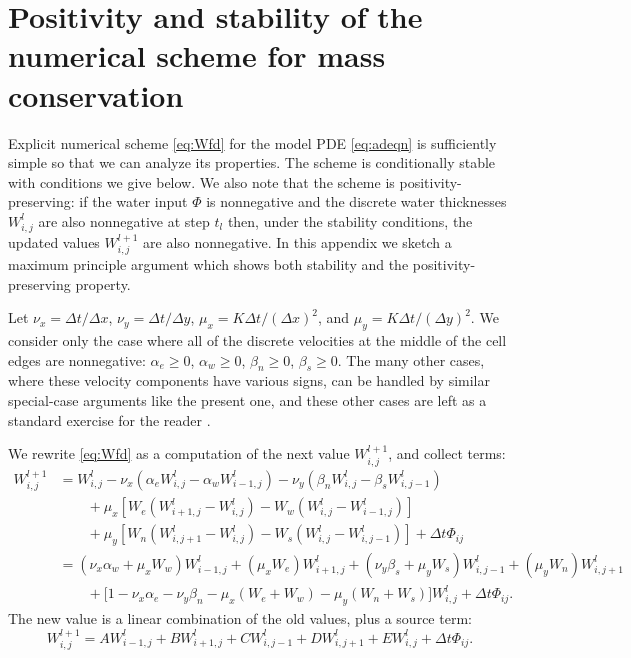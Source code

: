 \documentclass[11pt,final]{amsart}%
\newcommand{\Wlij}{W^l_{i,j}}
\begin{document}
\small

\normalsize

\appendix

\section{Positivity and stability of the numerical scheme for mass conservation}

Explicit numerical scheme \eqref{eq:Wfd} for the model PDE \eqref{eq:adeqn} is sufficiently simple so that we can analyze its properties.  The scheme is conditionally stable with conditions we give below.  We also note that the scheme is positivity-preserving: if the water input $\Phi$ is nonnegative and the discrete water thicknesses $\Wlij$ are also nonnegative at step $t_l$ then, under the stability conditions, the updated values $W_{i,j}^{l+1}$ are also nonnegative.  In this appendix we sketch a maximum principle argument \citep{MortonMayers} which shows both stability and the positivity-preserving property.

Let $\nu_x = \Delta t/\Delta x$, $\nu_y = \Delta t/\Delta y$, $\mu_x = K \Delta t / (\Delta x)^2$, and $\mu_y = K \Delta t / (\Delta y)^2$.  We consider only the case where all of the discrete velocities at the middle of the cell edges are nonnegative: $\alpha_e\ge 0$, $\alpha_w\ge 0$, $\beta_n\ge 0$, $\beta_s\ge 0$.  The many other cases, where these velocity components have various signs, can be handled by similar special-case arguments like the present one, and these other cases are left as a standard exercise for the reader \citep{MortonMayers}.

We rewrite \eqref{eq:Wfd} as a computation of the next value $W_{i,j}^{l+1}$, and collect terms:
\begin{align*}
 W_{i,j}^{l+1} &= \Wlij - \nu_x \left(\alpha_e \Wlij - \alpha_w W_{i-1,j}^l\right) - \nu_y \left(\beta_n \Wlij - \beta_s W_{i,j-1}^l\right)  \\
      &\qquad + \mu_x \left[W_e \left(W_{i+1,j}^l - \Wlij\right) - W_w \left(\Wlij - W_{i-1,j}^l\right)\right]  \\
      &\qquad + \mu_y \left[W_n \left(W_{i,j+1}^l - \Wlij\right) - W_s \left(\Wlij - W_{i,j-1}^l\right)\right] + \Delta t \Phi_{ij} \\
      &= (\nu_x \alpha_w + \mu_x W_w) W_{i-1,j}^l + (\mu_x W_e) W_{i+1,j}^l + (\nu_y \beta_s + \mu_y W_s) W_{i,j-1}^l + (\mu_y W_n) W_{i,j+1}^l \\
      &\qquad + \Big[1 - \nu_x \alpha_e - \nu_y \beta_n - \mu_x (W_e + W_w) - \mu_y (W_n + W_s)\Big] \Wlij + \Delta t \Phi_{ij}.
\end{align*}
The new value is a linear combination of the old values, plus a source term:
\begin{equation}
W_{i,j}^{l+1} = A W_{i-1,j}^l + B W_{i+1,j}^l + C W_{i,j-1}^l + D W_{i,j+1}^l + E \Wlij + \Delta t \Phi_{ij}. \label{eq:lincomb}
\end{equation}
\end{document}
